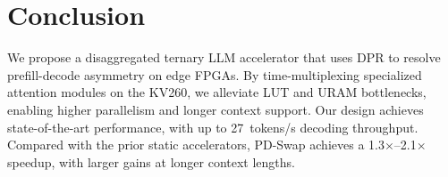 \documentclass[9pt,sigconf]{acmart}
\begin{document}
\section{Conclusion}

We propose a disaggregated ternary LLM accelerator that uses DPR to resolve prefill-decode asymmetry on edge FPGAs. By time-multiplexing specialized attention modules on the KV260, we alleviate LUT and URAM bottlenecks, enabling higher parallelism and longer context support. %
Our design achieves state-of-the-art performance, with up to 27~tokens/s decoding throughput. Compared with the prior static accelerators, PD-Swap achieves a 1.3$\times$--2.1$\times$ speedup, with larger gains at longer context lengths.






\appendix
\end{document}
